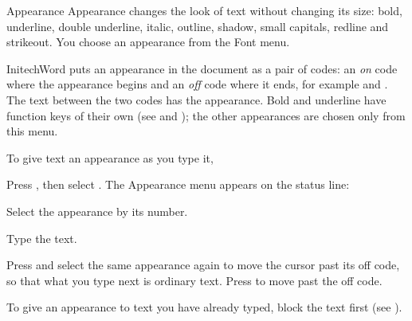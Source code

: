 \begin{Feature}{Appearance}
Appearance changes the look of text without changing its size: bold,
underline, double underline, italic, outline, shadow, small capitals,
redline and strikeout.  You choose an appearance from the Font menu.

InitechWord puts an appearance in the document as a pair of codes: an
\emph{on} code where the appearance begins and an \emph{off} code where it
ends, for example \Code{[ITALC]} and \Code{[italc]}.  The text between the
two codes has the appearance.  Bold and underline have function keys of
their own (see  and ); the other appearances
are chosen only from this menu.

To give text an appearance as you type it,
\begin{WPSteps}
\item Press , then select .  The
Appearance menu appears on the status line:
\item Select the appearance by its number.
\item Type the text.
\item Press  and select the same appearance again to move the
cursor past its off code, so that what you type next is ordinary text.
\Or
Press  to move past the off code.
\end{WPSteps}
\begin{WPNote}To give an appearance to text you have already typed, block
the text first (see ).\end{WPNote}


\end{Feature}
